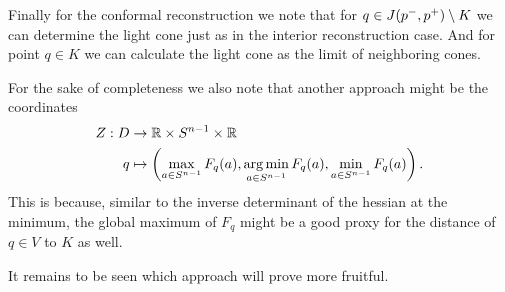 Finally for the conformal reconstruction we note that for $q\in J(p^-,p^+)\setminus K$ we can determine the light cone just as in the interior reconstruction case. And for point $q\in K$ we can calculate the light cone as the limit of neighboring cones.

\begin{remark}
    For the sake of completeness we also note that another approach might be the coordinates 
    \begin{align*}
        Z:D &\to \mathbb{R} \times {S^{n-1}} \times \mathbb{R} \\
        q & \mapsto \left(\max_{a\in {S^{n-1}}}F_q(a), \operatorname*{arg\,min}_{a\in {S^{n-1}}}F_q(a), \min_{a\in {S^{n-1}}}F_q(a)\right).
    \end{align*}
    This is because, similar to the inverse determinant of the hessian at the minimum, the global maximum of $F_q$ might be a good proxy for the distance of $q\in V$ to $K$ as well.

    It remains to be seen which approach will prove more fruitful.
\end{remark}